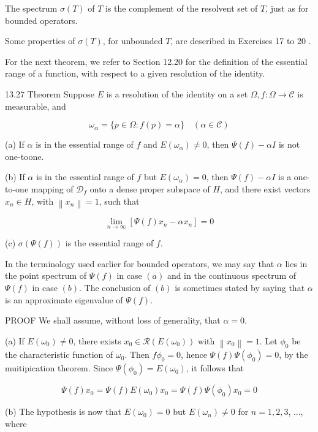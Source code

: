 \documentclass[10pt]{article}
\begin{document}
The spectrum $\sigma(T)$ of $T$ is the complement of the resolvent set of $T$, just as for bounded operators.

Some properties of $\sigma(T)$, for unbounded $T$, are described in Exercises 17 to 20 .

For the next theorem, we refer to Section 12.20 for the definition of the essential range of a function, with respect to a given resolution of the identity.

13.27 Theorem Suppose $E$ is a resolution of the identity on a set $\Omega, f: \Omega \rightarrow \mathscr{C}$ is measurable, and

$$
\omega_{\alpha}=\{p \in \Omega: f(p)=\alpha\} \quad(\alpha \in \mathscr{C})
$$

(a) If $\alpha$ is in the essential range of $f$ and $E\left(\omega_{\alpha}\right) \neq 0$, then $\Psi(f)-\alpha I$ is not one-toone.

(b) If $\alpha$ is in the essential range of $f$ but $E\left(\omega_{\alpha}\right)=0$, then $\Psi(f)-\alpha I$ is a one-to-one mapping of $\mathscr{D}_{f}$ onto a dense proper subspace of $H$, and there exist vectors $x_{n} \in H$, with $\left\|x_{n}\right\|=1$, such that

$$
\lim _{n \rightarrow \infty}\left[\Psi(f) x_{n}-\alpha x_{n}\right]=0
$$

(c) $\sigma(\Psi(f))$ is the essential range of $f$.

In the terminology used earlier for bounded operators, we may say that $\alpha$ lies in the point spectrum of $\Psi(f)$ in case $(a)$ and in the continuous spectrum of $\Psi(f)$ in case $(b)$. The conclusion of $(b)$ is sometimes stated by saying that $\alpha$ is an approximate eigenvalue of $\Psi(f)$.

PROOF We shall assume, without loss of generality, that $\alpha=0$.

(a) If $E\left(\omega_{0}\right) \neq 0$, there exists $x_{0} \in \mathscr{R}\left(E\left(\omega_{0}\right)\right)$ with $\left\|x_{0}\right\|=1$. Let $\phi_{0}$ be the characteristic function of $\omega_{0}$. Then $f \phi_{0}=0$, hence $\Psi(f) \Psi\left(\phi_{0}\right)=0$, by the muitipication theorem. Since $\Psi\left(\phi_{0}\right)=E\left(\omega_{0}\right)$, it follows that

$$
\Psi(f) x_{0}=\Psi(f) E\left(\omega_{0}\right) x_{0}=\Psi(f) \Psi\left(\phi_{0}\right) x_{0}=0
$$

(b) The hypothesis is now that $E\left(\omega_{0}\right)=0$ but $E\left(\omega_{n}\right) \neq 0$ for $n=1,2,3$, ..., where
\end{document}
